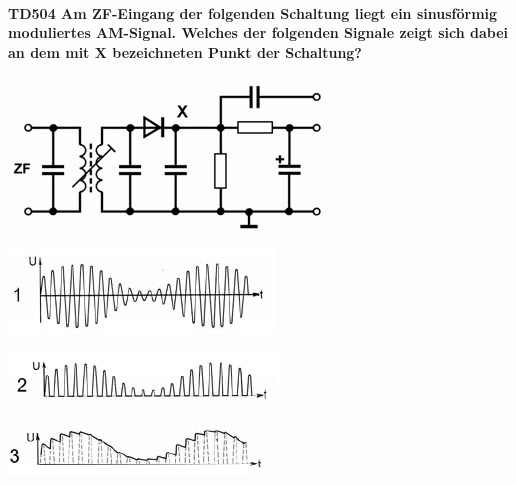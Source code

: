 \documentclass[8pt]{article}
\begin{document}
\begin{enumerate}
\begin{enumerate}[nolistsep,label=\Alph*]
\paragraph*{TD504 Am ZF-Eingang der folgenden Schaltung liegt ein sinusförmig moduliertes AM-Signal. Welches der folgenden Signale zeigt sich dabei an dem mit X bezeichneten Punkt der Schaltung?}
\begin{center}
	\begin{minipage}{\linewidth}
		\centering
		\includegraphics[scale=1.0]{pics/td504_a.jpg}
	\end{minipage}
\end{center}
\begin{center}
	\begin{minipage}{\linewidth}
		\centering
		\includegraphics[scale=1.0]{pics/td504_b.jpg}
	\end{minipage}
\end{center}
\begin{center}
	\begin{minipage}{\linewidth}
		\centering
		\includegraphics[scale=1.0]{pics/td504_c.jpg}
	\end{minipage}
\end{center}
\begin{center}
	\begin{minipage}{\linewidth}
		\centering
		\includegraphics[scale=1.0]{pics/td504_d.jpg}
	\end{minipage}
\end{center}

\end{enumerate}
\end{enumerate}
\end{document}
